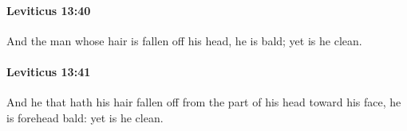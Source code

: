 		\paragraph{Leviticus 13:40} %
			\label{LEVITICUS-13-40}

			And the man whose hair is fallen off his head, he is bald; yet is he clean.


		\paragraph{Leviticus 13:41} %
			\label{LEVITICUS-13-41}

			And he that hath his hair fallen off from the part of his head toward his face, he is forehead bald: yet is he clean.


